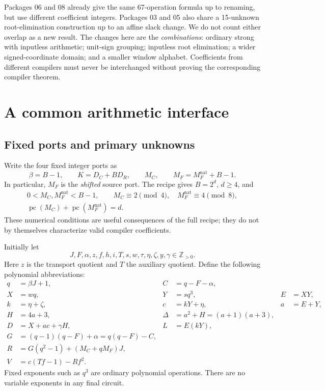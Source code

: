 \documentclass[11pt,a4paper]{article}
\theoremstyle{remark}\newtheorem{remark}[theorem]{Remark}
\newcommand{\Pos}{\mathbb Z_{>0}}
\newcommand{\pc}{\operatorname{pc}}
\begin{document}
Packages 06 and 08 already give the same 67-operation formula up to
renaming, but use different coefficient integers. Packages 03 and 05 also
share a 15-unknown root-elimination construction up to an affine slack
change. We do not count either overlap as a new result. The changes here
are the \emph{combinations}: ordinary strong with inputless arithmetic;
unit-sign grouping; inputless root elimination; a wider signed-coordinate
domain; and a smaller window alphabet. Coefficients from different
compilers must never be interchanged without proving the corresponding
compiler theorem.

\section{A common arithmetic interface}\label{sec:interface}

\subsection{Fixed ports and primary unknowns}

Write the four fixed integer ports as
\[
 \beta=B-1,\qquad K=D_C+BD_R,\qquad M_C,\qquad
 M_F=M_F^{\mathrm{nat}}+B-1.
\]
In particular, \(M_F\) is the \emph{shifted} source port. The recipe gives
\(B=2^d\), \(d\ge4\), and
\begin{gather}
 0<M_C,M_F^{\mathrm{nat}}<B-1,\qquad
 M_C\equiv2\pmod4,\quad M_F^{\mathrm{nat}}\equiv4\pmod8,\label{eq:masks}\\
 \pc(M_C)+\pc(M_F^{\mathrm{nat}})=d.\nonumber
\end{gather}
These numerical conditions are useful consequences of the full recipe;
they do not by themselves characterize valid compiler coefficients.

Initially let
\[
 J,F,\alpha,z,f,h,i,T,s,w,\tau,\eta,\zeta,y,\gamma\in\Pos.
\]
Here \(z\) is the transport quotient and \(T\) the auxiliary quotient.
Define the following polynomial abbreviations:
\begin{align}
 q&=\beta J+1,& C&=q-F-\alpha,\nonumber\\
 X&=wq,&Y&=sq^3,&E&=XY,\nonumber\\
 k&=\eta+\zeta,&c&=kY+\eta,&a&=E+Y,\nonumber\\
 H&=4a+3,&\Delta&=a^2+H=(a+1)(a+3),\label{eq:core}\\
 D&=X+ac+\gamma H,&L&=E(kY),\nonumber\\
 G&=(q-1)(q-F)+\alpha=q(q-F)-C,\nonumber\\
 R&=G(q^2-1)+(M_C+qM_F)J,\nonumber\\
 V&=c(Tf-1)-Rf^2.\nonumber
\end{align}
Fixed exponents such as \(q^3\) are ordinary polynomial operations.
There are no variable exponents in any final circuit.
\end{document}
